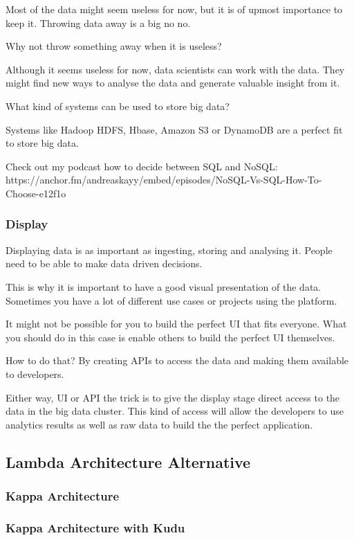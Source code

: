 \documentclass[12pt]{scrartcl} %
\begin{document}
Most of the data might seem useless for now, but it is of upmost importance to keep it. Throwing data away is a big no no.

Why not throw something away when it is useless?

Although it seems useless for now, data scientists can work with the data. They might find new ways to analyse the data and generate valuable insight from it.

What kind of systems can be used to store big data?

Systems like Hadoop HDFS, Hbase, Amazon S3 or DynamoDB are a perfect fit to store big data.

Check out my podcast how to decide between SQL and NoSQL: https://anchor.fm/andreaskayy/embed/episodes/NoSQL-Vs-SQL-How-To-Choose-e12f1o

\subsubsection{Display}
Displaying data is as important as ingesting, storing and analysing it. People need to be able to make data driven decisions.

This is why it is important to have a good visual presentation of the data. Sometimes you have a lot of different use cases or projects using the platform.

It might not be possible for you to build the perfect UI that fits everyone. What you should do in this case is enable others to build the perfect UI themselves.

How to do that? By creating APIs to access the data and making them available to developers.

Either way, UI or API the trick is to give the display stage direct access to the data in the big data cluster. This kind of access will allow the developers to use analytics results as well as raw data to build the the perfect application.

\subsection{Lambda Architecture Alternative }
\subsubsection{Kappa Architecture}
\subsubsection{Kappa Architecture with Kudu}
\end{document}
